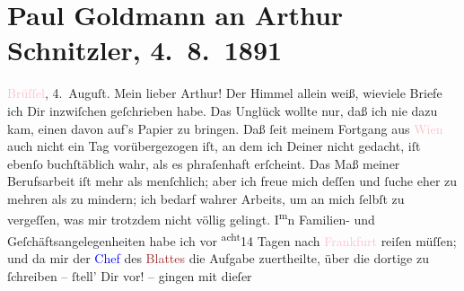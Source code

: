 

               \section[Paul Goldmann an Arthur Schnitzler, 4. 8. 1891]{ Paul Goldmann an Arthur Schnitzler, 4. 8. 1891}\nopagebreak{}\rehead{ }\normalsize\beginnumbering{} \toendnotes[C]{\smallbreak\pagebreak[2]} 
\toendnotes[C]{\smallbreak}\pstart
           \centering{}{\pb}\textcolor{pink}{Brüſſel}{}\ledrightnote{\textcolor{pink}{Brüssel}}, 4. Auguſt.\pend
           \pstart\center{}Mein lieber Arthur!\pend\pstart
           Der Himmel allein weiß, wieviele Briefe ich Dir inzwiſchen geſchrieben habe. Das
               Unglück wollte nur, daß ich nie dazu kam, einen davon auf’s Papier zu bringen. Daß
                   ſeit meinem Fortgang aus \textcolor{pink}{Wien}{}\ledrightnote{\textcolor{pink}{Wien}} auch nicht ein Tag vorübergezogen iſt, an dem ich Deiner
               nicht gedacht, iſt ebenſo buchſtäblich wahr, als es phraſenhaft erſcheint. Das Maß
               meiner Berufsarbeit iſt mehr als menſchlich; aber ich \strikeout{\textcolor{gray}{×}} freue mich deſſen und ſuche eher zu mehren als zu mindern; ich bedarf wahrer
                  Arbeits\label{K_L02668-10v}\label{K_L02668-10h}, um
               an mich ſelbſt zu vergeſſen, was mir trotzdem nicht völlig gelingt. I\substVorne{}\textsuperscript{m}\substDazwischen{}n\substHinten{} Familien- und Geſchäftsangelegenheiten habe ich vor \substVorne{}\textsuperscript{acht}\substDazwischen{}14\substHinten{} Tagen nach \textcolor{pink}{Frankfurt}{}\ledrightnote{\textcolor{pink}{Frankfurt am Main}} reiſen müſſen; und
               da mir der \textcolor{blue}{Chef}{} des \textcolor{brown}{Blattes}{} die Aufgabe zuertheilte,
               über die dortige \label{K_L02668-1v}\label{K_L02668-1h} zu ſchreiben – ſtell’ Dir vor! – gingen mit dieſer
